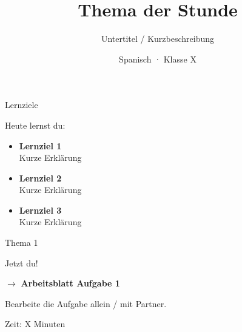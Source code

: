 \documentclass[aspectratio=169, 11pt]{beamer}
\title{Thema der Stunde}
\subtitle{Untertitel / Kurzbeschreibung}
\author{Spanisch · Klasse X}
\date{}
\newcommand{\abmark}[1]{{\Large$\rightarrow$ \textbf{Arbeitsblatt Aufgabe #1}}}
\begin{document}
\begin{frame}[plain]
    \titlepage
\end{frame}

\begin{frame}{Lernziele}
    \vspace{0.5cm}

    {\large Heute lernst du:}

    \vspace{0.8cm}

    \begin{itemize}
        \setlength{\itemsep}{0.6cm}
        \item \textbf{Lernziel 1}\\
              {\small Kurze Erklärung}
        \item \textbf{Lernziel 2}\\
              {\small Kurze Erklärung}
        \item \textbf{Lernziel 3}\\
              {\small Kurze Erklärung}
    \end{itemize}
\end{frame}


\begin{frame}{Thema 1}
    \vspace{0.3cm}


\end{frame}

\begin{frame}{Jetzt du!}
    \vspace{1cm}

    \begin{center}
        \abmark{1}

        \vspace{1cm}

        {\large Bearbeite die Aufgabe allein / mit Partner.}

        \vspace{0.5cm}

        {\small Zeit: X Minuten}
    \end{center}
\end{frame}
\end{document}
